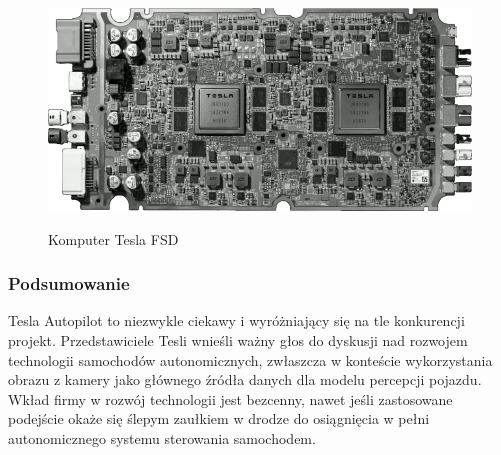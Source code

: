 \begin{figure}[h]
\begin{center}
\includegraphics[width=13.5cm]{resources/figures/tesla_fsd.png}
\caption{Komputer Tesla FSD}
\label{TeslaFsdHardware}
\end{center}
\end{figure}

\vspace{-0.7cm}
\subsubsection{Podsumowanie}
Tesla Autopilot to niezwykle ciekawy i wyróżniający się na tle konkurencji projekt. Przedstawiciele Tesli wnieśli ważny głos do dyskusji nad rozwojem technologii samochodów autonomicznych, zwłaszcza w konteście wykorzystania obrazu z kamery jako głównego źródła danych dla modelu percepcji pojazdu. Wkład firmy w rozwój technologii jest bezcenny, nawet jeśli zastosowane podejście okaże się ślepym zaułkiem w drodze do osiągnięcia w pełni autonomicznego systemu sterowania samochodem.